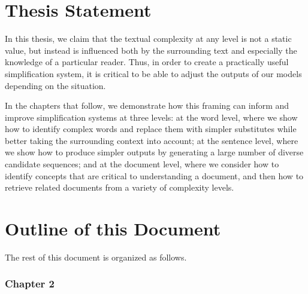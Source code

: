 \documentclass[thesis.tex]{subfiles}
\begin{document}
\section{Thesis Statement}

In this thesis, we claim that the textual complexity at any level is not a static value, but instead is influenced both by the surrounding text and especially the knowledge of a particular reader. Thus, in order to create a practically useful simplification system, it is critical to be able to adjust the outputs of our models depending on the situation. 

In the chapters that follow, we demonstrate how this framing can inform and improve simplification systems at three levels: at the word level, where we show how to identify complex words and replace them with simpler substitutes while better taking the surrounding context into account; at the sentence level, where we show how to produce simpler outputs by generating a large number of diverse candidate sequences; and at the document level, where we consider how to identify concepts that are critical to understanding a document, and then how to retrieve related documents from a variety of complexity levels.


\section{Outline of this Document}

The rest of this document is organized as follows.

\subsubsection{Chapter 2}
\end{document}
